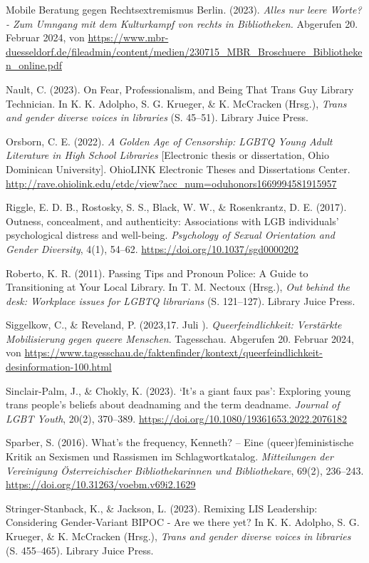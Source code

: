 \documentclass[a4paper,
fontsize=11pt,
oneside,
numbers=noperiodatend,
parskip=half-,
bibliography=totoc,
final
]{scrartcl}
\begin{document}
Mobile Beratung gegen Rechtsextremismus Berlin. (2023). \emph{Alles nur
leere Worte? - Zum Umngang mit dem Kulturkampf von rechts in
Bibliotheken.} Abgerufen 20. Februar 2024, von
\url{https://www.mbr-duesseldorf.de/fileadmin/content/medien/230715_MBR_Broschuere_Bibliotheken_online.pdf}

Nault, C. (2023). On Fear, Professionalism, and Being That Trans Guy
Library Technician. In K. K. Adolpho, S. G. Krueger, \& K. McCracken
(Hrsg.), \emph{Trans and gender diverse voices in libraries} (S.
45--51). Library Juice Press.

Orsborn, C. E. (2022). \emph{A Golden Age of Censorship: LGBTQ Young
Adult Literature in High School Libraries} {[}Electronic thesis or
dissertation, Ohio Dominican University{]}. OhioLINK Electronic Theses
and Dissertations Center.
\url{http://rave.ohiolink.edu/etdc/view?acc_num=oduhonors1669994581915957}

Riggle, E. D. B., Rostosky, S. S., Black, W. W., \& Rosenkrantz, D. E.
(2017). Outness, concealment, and authenticity: Associations with LGB
individuals' psychological distress and well-being. \emph{Psychology of
Sexual Orientation and Gender Diversity}, 4(1), 54--62.
\url{https://doi.org/10.1037/sgd0000202}

Roberto, K. R. (2011). Passing Tips and Pronoun Police: A Guide to
Transitioning at Your Local Library. In T. M. Nectoux (Hrsg.), \emph{Out
behind the desk: Workplace issues for LGBTQ librarians} (S. 121--127).
Library Juice Press.

Siggelkow, C., \& Reveland, P. (2023,17. Juli ).
\emph{Queerfeindlichkeit: Verstärkte Mobilisierung gegen queere
Menschen}. Tagesschau. Abgerufen 20. Februar 2024, von
\url{https://www.tagesschau.de/faktenfinder/kontext/queerfeindlichkeit-desinformation-100.html}

Sinclair-Palm, J., \& Chokly, K. (2023). \enquote*{It's a giant faux
pas}: Exploring young trans people's beliefs about deadnaming and the
term deadname. \emph{Journal of LGBT Youth}, 20(2), 370--389.
\url{https://doi.org/10.1080/19361653.2022.2076182}

Sparber, S. (2016). What's the frequency, Kenneth? -- Eine
(queer)feministische Kritik an Sexismen und Rassismen im
Schlagwortkatalog. \emph{Mitteilungen der Vereinigung Österreichischer
Bibliothekarinnen und Bibliothekare}, 69(2), 236--243.
\url{https://doi.org/10.31263/voebm.v69i2.1629}

Stringer-Stanback, K., \& Jackson, L. (2023). Remixing LIS Leadership:
Considering Gender-Variant BIPOC - Are we there yet? In K. K. Adolpho,
S. G. Krueger, \& K. McCracken (Hrsg.), \emph{Trans and gender diverse
voices in libraries} (S. 455--465). Library Juice Press.
\end{document}
